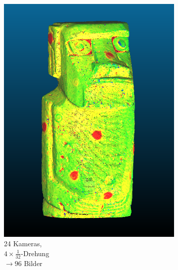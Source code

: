 \documentclass[./00PhotoBox.tex]{subfiles}
\begin{document}
\begin{figure}
\begin{subfigure}{0.30\textwidth}
        \includegraphics[width=1\linewidth]{img/7_versuche/cam_anzahl/feinschritt.png}
        \centering
        \caption{
            24 Kameras,\\
            $4 \times \frac{1}{32}$-Drehung\\
            $\rightarrow 96$ Bilder
        }
        \label{img:moai_feinschritt}
    \end{subfigure}
    \begin{subfigure}{0.30\textwidth}

\end{subfigure}
\end{figure}
\end{document}
